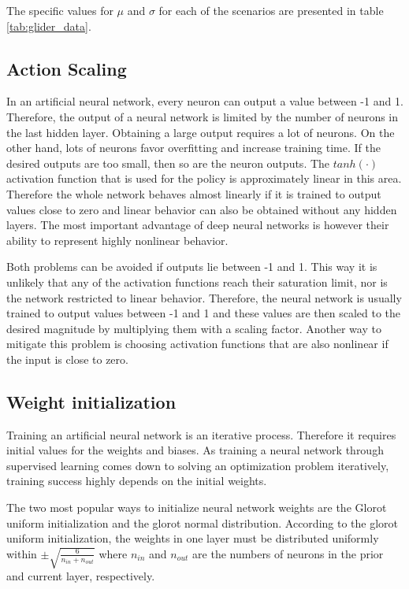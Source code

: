 The specific values for $\mu$ and $\sigma$ for each of the scenarios are presented in table \ref{tab:glider_data}.

\subsection*{Action Scaling}

In an artificial neural network, every neuron can output a value between -1 and 1. Therefore, the output of a neural network is limited by the number of neurons in the last hidden layer. Obtaining a large output requires a lot of neurons. On the other hand, lots of neurons favor overfitting and increase training time. If the desired outputs are too small, then so are the neuron outputs. The $tanh(\cdot)$ activation function that is used for the policy is approximately linear in this area. Therefore the whole network behaves almost linearly if it is trained to output values close to zero and linear behavior can also be obtained without any hidden layers. The most important advantage of deep neural networks is however their ability to represent highly nonlinear behavior.

Both problems can be avoided if outputs lie between -1 and 1. This way it is unlikely that any of the activation functions reach their saturation limit, nor is the network restricted to linear behavior. Therefore, the neural network is usually trained to output values between -1 and 1 and these values are then scaled to the desired magnitude by multiplying them with a scaling factor. Another way to mitigate this problem is choosing activation functions that are also nonlinear if the input is close to zero.

\subsection*{Weight initialization}

Training an artificial neural network is an iterative process. Therefore it requires initial values for the weights and biases. As training a neural network through supervised learning comes down to solving an optimization problem iteratively, training success highly depends on the initial weights.

The two most popular ways to initialize neural network weights are the Glorot uniform initialization and the glorot normal distribution. According to the glorot uniform initialization, the weights in one layer must be distributed uniformly within $\pm \sqrt{\frac{6}{n_{in}+n_{out}}}$ where $n_{in}$ and $n_{out}$ are the numbers of neurons in the prior and current layer, respectively.


